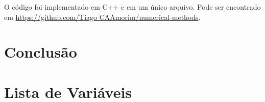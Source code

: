 \documentclass[final,5p]{elsarticle}
\numberwithin{equation}{section}
\begin{document}


        O código foi implementado em C++ e em um único arquivo. Pode ser encontrado em \href{https://github.com/TiagoCAAmorim/numerical-methods/blob/main/10_GaussElim/10_GaussElim.cpp}{https://github.com/Tiago CAAmorim/numerical-methods}.

    \section{Conclusão}





\appendix

\section{Lista de Variáveis}
\end{document}
